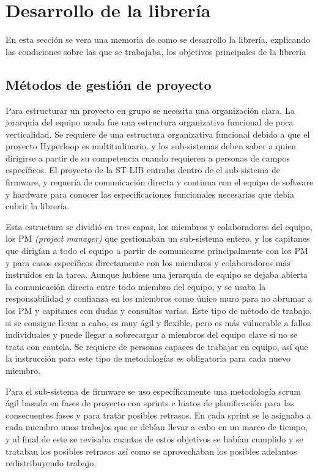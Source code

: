 \documentclass{report}
\begin{document}
\newpage

\section{Desarrollo de la librería}

En esta sección se vera una memoria de como se desarrollo la librería, explicando las condiciones sobre las que se trabajaba, los objetivos principales de la librería \par


\subsection{Métodos de gestión de proyecto}
Para estructurar un proyecto en grupo se necesita una organización clara. La jerarquía del equipo usada fue una estructura organizativa funcional de poca verticalidad. Se requiere de una estructura organizativa funcional debido a que el proyecto Hyperloop es multitudinario, y los sub-sistemas deben saber a quien dirigirse a partir de su competencia cuando requieren a personas de campos específicos. El proyecto de la ST-LIB entraba dentro de el sub-sistema de firmware, y requería de comunicación directa y continua con el equipo de software y hardware para conocer las especificaciones funcionales necesarias que debía cubrir la librería. \par\vspace{0.3 cm}
Esta estructura se dividió en tres capas, los miembros y colaboradores del equipo, los PM \textit{(project manager)} que gestionaban un sub-sistema entero, y los capitanes que dirigían a todo el equipo a partir de comunicarse principalmente con los PM y para casos específicos directamente con los miembros y colaboradores más instruidos en la tarea. Aunque hubiese una jerarquía de equipo se dejaba abierta la comunicación directa entre todo miembro del equipo, y se usaba la responsabilidad y confianza en los miembros como único muro para no abrumar a los PM y capitanes con dudas y consultas varias. Este tipo de método de trabajo, si se consigue llevar a cabo, es muy ágil y flexible, pero es más vulnerable a fallos individuales y puede llegar a sobrecargar a miembros del equipo clave si no se trata con cautela. Se requiere de personas capaces de trabajar en equipo, así que la instrucción para este tipo de metodologías es obligatoria para cada nuevo miembro. 
\par \vspace{0.3 cm}
Para el sub-sistema de firmware se uso específicamente una metodología scrum ágil basada en fases de proyecto con sprints e hiatos de planificación para las consecuentes fases y para tratar posibles retrasos. En cada sprint se le asignaba a cada miembro unos trabajos que se debían llevar a cabo en un marco de tiempo, y al final de este se revisaba cuantos de estos objetivos se habían cumplido y se trataban los posibles retrasos así como se aprovechaban los posibles adelantos redistribuyendo trabajo. \par \vspace{0.3 cm}
\end{document}
